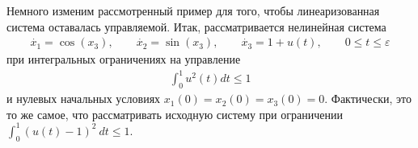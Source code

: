 \documentclass[../main.tex]{subfiles}
\begin{document}
    Немного изменим рассмотренный пример для того, чтобы линеаризованная система оставалась управляемой. Итак, рассматривается нелинейная система
    \begin{gather}\label{unicycle1}
        \dot{x_1} = \cos(x_3), \qquad
        \dot{x_2} = \sin(x_3), \qquad
        \dot{x_3} = 1 + u(t), \qquad 0 \leqslant t \leqslant \varepsilon
    \end{gather}
    при интегральных ограничениях на управление 
    \begin{gather*}
        \int_0^1 u^2(t) dt \leqslant 1
    \end{gather*}
    и нулевых начальных условиях $ x_1(0) = x_2(0) = x_3(0) = 0 $. Фактически, это то же самое, что рассматривать исходную систему при ограничении $ \displaystyle{\int_0^1} \left( u(t) - 1\right)^2 \ dt \leqslant 1$.
    
\end{document}
